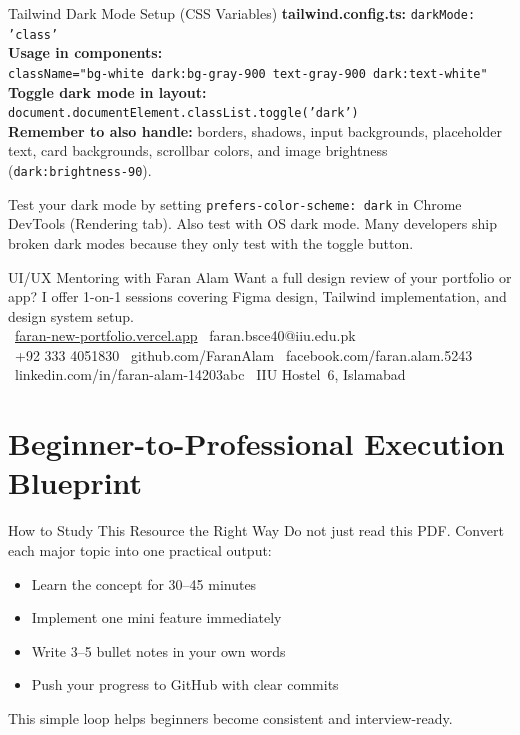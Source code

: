 \documentclass[12pt,a4paper]{article}
\begin{document}
\begin{tokenbox}{Tailwind Dark Mode Setup (CSS Variables)}
\textbf{tailwind.config.ts:} \texttt{darkMode: 'class'}\\[0.3cm]
\textbf{Usage in components:}\\
\texttt{className="bg-white dark:bg-gray-900 text-gray-900 dark:text-white"}\\[0.3cm]
\textbf{Toggle dark mode in layout:}\\
\texttt{document.documentElement.classList.toggle('dark')}\\[0.3cm]
\textbf{Remember to also handle:} borders, shadows, input backgrounds, placeholder text, card backgrounds, scrollbar colors, and image brightness (\texttt{dark:brightness-90}).
\end{tokenbox}

\vspace{0.4cm}
\begin{tipbox}
Test your dark mode by setting \texttt{prefers-color-scheme: dark} in Chrome DevTools (Rendering tab). Also test with OS dark mode. Many developers ship broken dark modes because they only test with the toggle button.
\end{tipbox}

\vspace{0.5cm}
\begin{infobox}{UI/UX Mentoring with Faran Alam}
Want a full design review of your portfolio or app? I offer 1-on-1 sessions covering Figma design, Tailwind implementation, and design system setup.\\[0.2cm]
\faGlobe\ \href{https://faran-new-portfolio.vercel.app/}{faran-new-portfolio.vercel.app} \quad \faEnvelope\ faran.bsce40@iiu.edu.pk\\[0.1cm]
\faWhatsapp\ +92 333 4051830 \quad \faGithub\ github.com/FaranAlam \quad \faFacebook\ facebook.com/faran.alam.5243\\[0.1cm]
\faLinkedin\ linkedin.com/in/faran-alam-14203abc \quad \faMapMarkerAlt\ IIU Hostel~6, Islamabad
\end{infobox}


\section{Beginner-to-Professional Execution Blueprint}

\begin{infobox}{How to Study This Resource the Right Way}
Do not just read this PDF. Convert each major topic into one practical output:
\begin{itemize}[leftmargin=1.5em, itemsep=4pt]
    \item[\ding{52}] Learn the concept for 30--45 minutes
    \item[\ding{52}] Implement one mini feature immediately
    \item[\ding{52}] Write 3--5 bullet notes in your own words
    \item[\ding{52}] Push your progress to GitHub with clear commits
\end{itemize}
This simple loop helps beginners become consistent and interview-ready.
\end{infobox}
\end{document}
